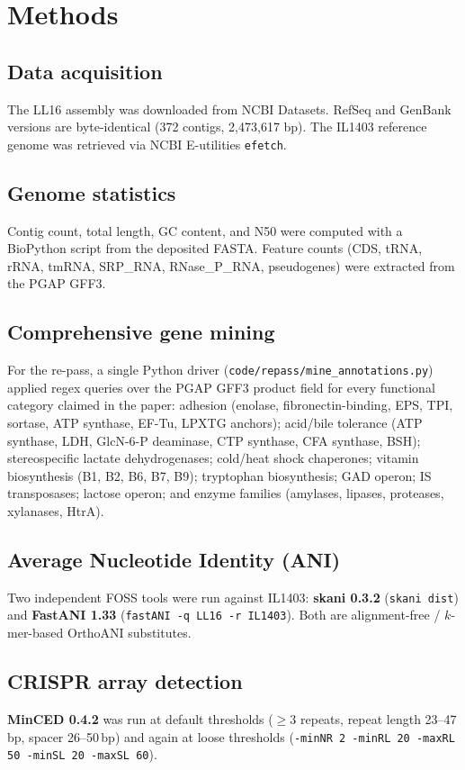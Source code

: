 \documentclass[11pt,letterpaper]{article}
\begin{document}
\section{Methods}

\subsection{Data acquisition}
The LL16 assembly was downloaded from NCBI Datasets. RefSeq and GenBank
versions are byte-identical (372 contigs, 2{,}473{,}617 bp). The IL1403
reference genome was retrieved via NCBI E-utilities \texttt{efetch}.

\subsection{Genome statistics}
Contig count, total length, GC content, and N50 were computed with a
BioPython script from the deposited FASTA. Feature counts (CDS, tRNA,
rRNA, tmRNA, SRP\_RNA, RNase\_P\_RNA, pseudogenes) were extracted from
the PGAP GFF3.

\subsection{Comprehensive gene mining}
For the re-pass, a single Python driver
(\texttt{code/repass/mine\_annotations.py}) applied regex queries over
the PGAP GFF3 product field for every functional category claimed in
the paper: adhesion (enolase, fibronectin-binding, EPS, TPI, sortase,
ATP synthase, EF-Tu, LPXTG anchors); acid/bile tolerance
(ATP synthase, LDH, GlcN-6-P deaminase, CTP synthase, CFA synthase,
BSH); stereospecific lactate dehydrogenases; cold/heat shock chaperones;
vitamin biosynthesis (B1, B2, B6, B7, B9); tryptophan biosynthesis;
GAD operon; IS transposases; lactose operon; and enzyme families
(amylases, lipases, proteases, xylanases, HtrA).

\subsection{Average Nucleotide Identity (ANI)}
Two independent FOSS tools were run against IL1403:
\textbf{skani 0.3.2} (\texttt{skani dist}) and
\textbf{FastANI 1.33} (\texttt{fastANI -q LL16 -r IL1403}).
Both are alignment-free / $k$-mer-based OrthoANI substitutes.

\subsection{CRISPR array detection}
\textbf{MinCED 0.4.2} was run at default thresholds
($\geq 3$ repeats, repeat length 23--47\,bp, spacer 26--50\,bp) and
again at loose thresholds
(\texttt{-minNR 2 -minRL 20 -maxRL 50 -minSL 20 -maxSL 60}).
\end{document}
